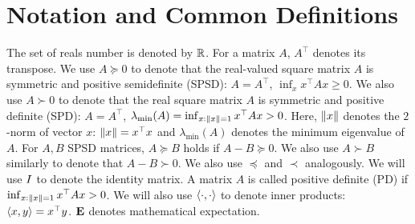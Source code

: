 \section{Notation and Common Definitions}
\label{sec:not}

The set of reals number is denoted by $\mathbb{R}$.
For a matrix $A$, $A^\top$ denotes its transpose.
We use $A\succeq 0$ to denote that the real-valued  
square matrix $A$ is symmetric and positive semidefinite (SPSD):
$A = A^\top$, $\inf_x x^\top A x\ge 0$.
We also use $A \succ 0$ to denote that the real square matrix $A$ is symmetric and positive definite (SPD):
$A = A^\top$, $\lambda_{\min}(A) =\inf_{x:\left\| x\right\|=1} x^\top A x>0$. 
Here, $\left\| x\right\|$ denotes the $2$-norm of vector $x$: $\left\| x\right\| = x^\top x$ and 
$\lambda_{\min}(A)$ denotes the minimum eigenvalue of $A$.
For $A,B$ SPSD matrices, $A\succeq B$ holds if $A-B\succeq 0$.
We also use $A\succ B$ similarly to denote that $A-B \succ 0$.
We also use $\preceq$ and $\prec$ analogously. We will use $I$ to denote the identity matrix.
%
A matrix $A$ is called positive definite (PD) if $\inf_{x:\left\| x\right\|=1} x^\top A x >0$.
%
We will also use $\langle\cdot,\cdot\rangle$ to denote inner products: $\langle x,y\rangle = x^\top y$.
%
$\mathbf{E}$ denotes mathematical expectation.


